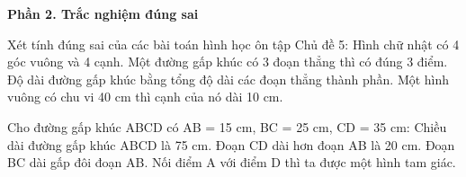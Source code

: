 \textbf{Phần 2. Trắc nghiệm đúng sai}

\begin{ex} %
Xét tính đúng sai của các bài toán hình học ôn tập Chủ đề 5:
\choiceTF
{\True Hình chữ nhật có 4 góc vuông và 4 cạnh.}
{Một đường gấp khúc có 3 đoạn thẳng thì có đúng 3 điểm.}
{\True Độ dài đường gấp khúc bằng tổng độ dài các đoạn thẳng thành phần.}
{\True Một hình vuông có chu vi 40 cm thì cạnh của nó dài 10 cm.}
\end{ex}

\begin{ex} %
Cho đường gấp khúc ABCD có AB = 15 cm, BC = 25 cm, CD = 35 cm:
\choiceTF
{\True Chiều dài đường gấp khúc ABCD là 75 cm.}
{\True Đoạn CD dài hơn đoạn AB là 20 cm.}
{Đoạn BC dài gấp đôi đoạn AB.}
{Nối điểm A với điểm D thì ta được một hình tam giác.}
\end{ex}

